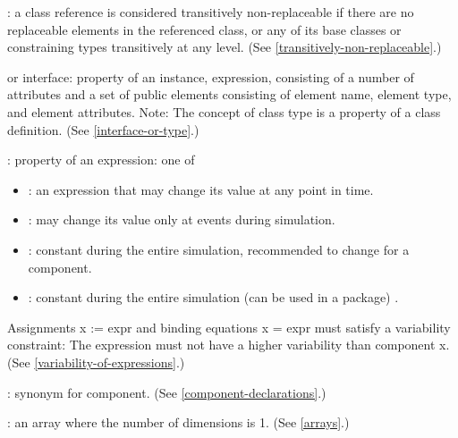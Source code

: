 : a class reference is considered
transitively non-replaceable if there are no replaceable elements in the
referenced class, or any of its base classes or constraining types
transitively at any level. (See \cref{transitively-non-replaceable}.)

 or interface: property of an instance, expression, consisting of a number of attributes and a set of public
elements consisting of element name, element type, and element
attributes. Note: The concept of class type is a property of a class
definition. (See \cref{interface-or-type}.)

: property of an expression: one of
\begin{itemize}
\item {}: an expression that may change its value at any
point in time.
\item {}: may change its value only at events during
simulation.
\item {}: constant during the entire simulation, recommended
to change for a component.
\item {}: constant during the entire simulation (can be used
in a package) .
\end{itemize}

Assignments x := expr and binding equations x = expr must satisfy a
variability constraint: The expression must not have a higher
variability than component x. (See \cref{variability-of-expressions}.)

: synonym for component. (See \cref{component-declarations}.)

: an array where the number of dimensions is 1. (See
\cref{arrays}.)
